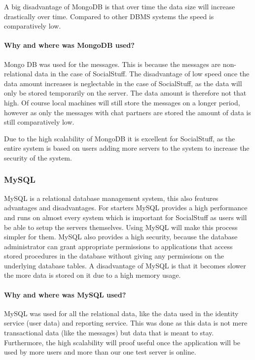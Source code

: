 A big disadvantage of MongoDB is that over time the data size will increase drastically over time.
Compared to other DBMS systems the speed is comparatively low.

\paragraph{Why and where was MongoDB used?}
Mongo DB was used for the messages.
This is because the messages are non-relational data in the case of SocialStuff.
The disadvantage of low speed once the data amount increases is neglectable in the case of SocialStuff, as the data will
only be stored temporarily on the server.
The data amount is therefore not that high.
Of course local machines will still store the messages on a longer period, however as only the messages with chat
partners are stored the amount of data is still comparatively low.

Due to the high scalability of MongoDB it is excellent for SocialStuff, as the entire system is based on users adding
more servers to the system to increase the security of the system.

\subsubsection{MySQL}
MySQL is a relational database management system, this also features advantages and disadvantages.
For starters MySQL provides a high performance and runs on almost every system which is important for SocialStuff as
users will be able to setup the servers themselves.
Using MySQL will make this process simpler for them.
MySQL also provides a high security, because the database administrator can grant appropriate permissions to
applications that access stored procedures in the database without giving any permissions on the underlying database
tables.
A disadvantage of MySQL is that it becomes slower the more data is stored on it due to a high memory usage.

\paragraph{Why and where was MySQL used?}
MySQL was used for all the relational data, like the data used in the identity service (user data) and reporting
service.
This was done as this data is not mere transactional data (like the messages) but data that is meant to stay.
Furthermore, the high scalability will proof useful once the application will be used by more users and more than our
one test server is online.

